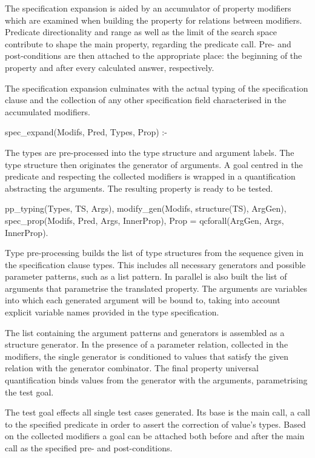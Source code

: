 The specification expansion is aided by an accumulator of property
modifiers which are examined when building the property for relations
between modifiers.
%
Predicate directionality and range as well as the limit of the search
space contribute to shape the main property, regarding the predicate
call.
%
Pre- and post-conditions are then attached to the appropriate place: the
beginning of the property and after every calculated answer,
respectively.


The specification expansion culminates with the actual typing of the
specification clause and the collection of any other specification field
characterised in the accumulated modifiers.
%
\begin{yapcode}
 spec_expand(Modifs, Pred, Types, Prop) :-
\end{yapcode}
%
The types are pre-processed into the type structure and argument labels.
%
The type structure then originates the generator of arguments.
%
A goal centred in the predicate and respecting the collected modifiers
is wrapped in a quantification abstracting the arguments.
%
The resulting property is ready to be tested.
%
\begin{yapcode}
   pp_typing(Types, TS, Args),
   modify_gen(Modifs, structure(TS), ArgGen),
   spec_prop(Modifs, Pred, Args, InnerProp),
   Prop = qcforall(ArgGen, Args, InnerProp).
\end{yapcode}



Type pre-processing builds the list of type structures from the sequence
given in the specification clause types.
%
This includes all necessary generators and possible parameter patterns,
such as a list pattern.
%
In parallel is also built the list of arguments that parametrise the
translated property.
%
The arguments are variables into which each generated argument will be
bound to, taking into account explicit variable names provided in the
type specification.



The list containing the argument patterns and generators is assembled
as a structure generator.
%
In the presence of a parameter relation, collected in the modifiers, the
single generator is conditioned to values that satisfy the given
relation with the  generator combinator.
%
The final property universal quantification binds values from the
generator with the arguments, parametrising the test goal.



The test goal effects all single test cases generated.
%
Its base is the main call, a call to the specified predicate in order to
assert the correction of value's types.
%
Based on the collected modifiers a goal can be attached both before and
after the main call as the specified pre- and post-conditions.

\begin{yapcode}
\end{yapcode}
\begin{yapcode}
\end{yapcode}

\begin{yapcode}
\end{yapcode}
